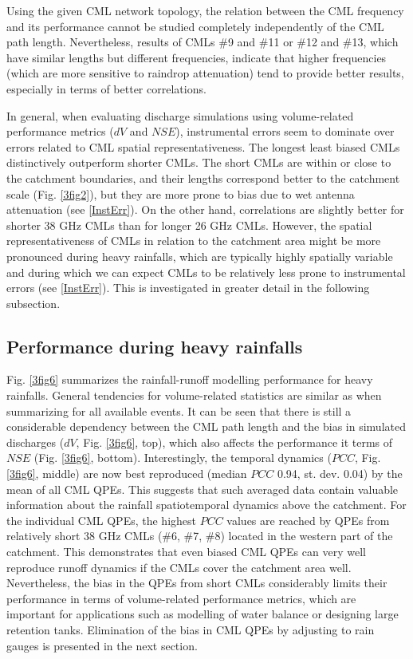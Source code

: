 \documentclass{ctuthesis}\usepackage[]{graphicx}\usepackage[]{color}
\begin{document}
Using the given CML network topology, the relation between the CML frequency and its performance cannot be studied completely independently of the CML path length. Nevertheless, results of CMLs \#9 and \#11 or \#12 and \#13, which have similar lengths but different frequencies, indicate that higher frequencies (which are more sensitive to raindrop attenuation) tend to provide better results, especially in terms of better correlations.
 
In general, when evaluating discharge simulations using volume-related performance metrics ($dV$ and $NSE$), instrumental errors seem to dominate over errors related to CML spatial representativeness. The longest least biased CMLs distinctively outperform shorter CMLs. The short CMLs are within or close to the catchment boundaries, and their lengths correspond better to the catchment scale (Fig. \ref{3fig2}), but they are more prone to bias due to wet antenna attenuation (see \ref{InstErr}). On the other hand, correlations are slightly better for shorter 38 GHz CMLs than for longer 26 GHz CMLs. However, the spatial representativeness of CMLs in relation to the catchment area might be more pronounced during heavy rainfalls, which are typically highly spatially variable and during which we can expect CMLs to be relatively less prone to instrumental errors (see \ref{InstErr}). This is investigated in greater detail in the following subsection.

\subsection{Performance during heavy rainfalls}

Fig. \ref{3fig6} summarizes the rainfall-runoff modelling performance for heavy rainfalls. General tendencies for volume-related statistics are similar as when summarizing for all available events. It can be seen that there is still a considerable dependency between the CML path length and the bias in simulated discharges ($dV$, Fig. \ref{3fig6}, top), which also affects the performance it terms of $NSE$ (Fig. \ref{3fig6}, bottom). Interestingly, the temporal dynamics ($PCC$, Fig. \ref{3fig6}, middle) are now best reproduced (median $PCC$ 0.94, st. dev. 0.04) by the mean of all CML QPEs. This suggests that such averaged data contain valuable information about the rainfall spatiotemporal dynamics above the catchment. For the individual CML QPEs, the highest $PCC$ values are reached by QPEs from relatively short 38 GHz CMLs (\#6, \#7, \#8) located in the western part of the catchment. This demonstrates that even biased CML QPEs can very well reproduce runoff dynamics if the CMLs cover the catchment area well. Nevertheless, the bias in the QPEs from short CMLs considerably limits their performance in terms of volume-related performance metrics, which are important for applications such as modelling of water balance or designing large retention tanks. Elimination of the bias in CML QPEs by adjusting to rain gauges is presented in the next section.
\end{document}
